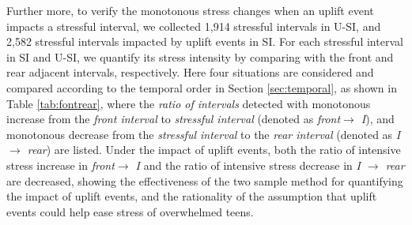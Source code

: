 Further more,
to verify the monotonous stress changes when an uplift event impacts a stressful interval,
we collected 1,914 stressful intervals in U-SI,
and 2,582 stressful intervals impacted by uplift events in SI.
For each stressful interval in SI and U-SI,
we quantify its stress intensity by comparing with the front and rear adjacent intervals, respectively.
Here four situations are considered and compared according to the temporal order in Section \ref{sec:temporal},
as shown in Table \ref{tab:fontrear},
where the \emph{ratio of intervals} detected with monotonous increase from the \emph{front interval} to \emph{stressful interval} (denoted as \emph{front$ \rightarrow$ I}),
and monotonous decrease from the \emph{stressful interval} to the \emph{rear interval} (denoted as \emph{I $\rightarrow$ rear}) are listed.
Under the impact of uplift events,
both the ratio of intensive stress increase in \emph{front$ \rightarrow$ I}
and the ratio of intensive stress decrease in \emph{I $\rightarrow$ rear} are decreased,
showing the effectiveness of the two sample method for quantifying the impact of uplift events,
and the rationality of the assumption that uplift events could help ease stress of overwhelmed teens.


